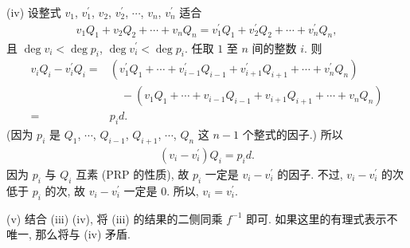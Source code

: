 \begin{pf}
    (iv) 设整式 $v_1$, $v_1^{\prime}$, $v_2$, $v_2^{\prime}$, $\cdots$, $v_n$, $v_n^{\prime}$ 适合
    \begin{align*}
        v_1 Q_1 + v_2 Q_2 + \cdots + v_n Q_n = v_1^{\prime} Q_1 + v_2^{\prime} Q_2 + \cdots + v_n^{\prime} Q_n,
    \end{align*}
    且 $\deg v_i < \deg p_i$, $\deg v_i^{\prime} < \deg p_i$. 任取 $1$ 至 $n$ 间的整数 $i$. 则
    \begin{align*}
        v_i Q_i - v_i^{\prime} Q_i
        = {} & (v_1^{\prime} Q_1 + \cdots + v_{i-1}^{\prime} Q_{i-1} + v_{i+1}^{\prime} Q_{i+1} + \cdots + v_n^{\prime} Q_n) \\
             & \quad - (v_1 Q_1 + \cdots + v_{i-1} Q_{i-1} + v_{i+1} Q_{i+1} + \cdots +  v_n Q_n)                            \\
        = {} & p_i d.
    \end{align*}
    (因为 $p_i$ 是 $Q_1$, $\cdots$, $Q_{i-1}$, $Q_{i+1}$, $\cdots$, $Q_n$ 这 $n-1$ 个整式的因子.) 所以
    \begin{align*}
        (v_i - v_i^{\prime}) Q_i = p_i d.
    \end{align*}
    因为 $p_i$ 与 $Q_i$ 互素 (PRP 的性质), 故 $p_i$ 一定是 $v_i - v_i^{\prime}$ 的因子. 不过, $v_i - v_i^{\prime}$ 的次低于 $p_i$ 的次, 故 $v_i - v_i^{\prime}$ 一定是 $0$. 所以, $v_i = v_i^{\prime}$.

    (v) 结合 (iii) (iv), 将 (iii) 的结果的二侧同乘 $f^{-1}$ 即可. 如果这里的有理式表示不唯一, 那么将与 (iv) 矛盾.
\end{pf}

